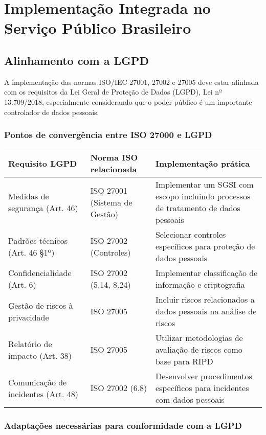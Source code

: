 \documentclass[12pt,a4paper]{report}
\begin{document}
\chapter{Implementação Integrada no Serviço Público Brasileiro}

\section{Alinhamento com a LGPD}

A implementação das normas ISO/IEC 27001, 27002 e 27005 deve estar alinhada com os requisitos da Lei Geral de Proteção de Dados (LGPD), Lei nº 13.709/2018, especialmente considerando que o poder público é um importante controlador de dados pessoais.

\subsection{Pontos de convergência entre ISO 27000 e LGPD}

\begin{longtable}{p{4cm}p{5cm}p{6cm}}
\toprule
\textbf{Requisito LGPD} & \textbf{Norma ISO relacionada} & \textbf{Implementação prática} \\
\midrule
Medidas de segurança (Art. 46) & ISO 27001 (Sistema de Gestão) & Implementar um SGSI com escopo incluindo processos de tratamento de dados pessoais \\
\midrule
Padrões técnicos (Art. 46 §1º) & ISO 27002 (Controles) & Selecionar controles específicos para proteção de dados pessoais \\
\midrule
Confidencialidade (Art. 6) & ISO 27002 (5.14, 8.24) & Implementar classificação de informação e criptografia \\
\midrule
Gestão de riscos à privacidade & ISO 27005 & Incluir riscos relacionados a dados pessoais na análise de riscos \\
\midrule
Relatório de impacto (Art. 38) & ISO 27005 & Utilizar metodologias de avaliação de riscos como base para RIPD \\
\midrule
Comunicação de incidentes (Art. 48) & ISO 27002 (6.8) & Desenvolver procedimentos específicos para incidentes com dados pessoais \\
\bottomrule
\end{longtable}

\subsection{Adaptações necessárias para conformidade com a LGPD}
\end{document}
